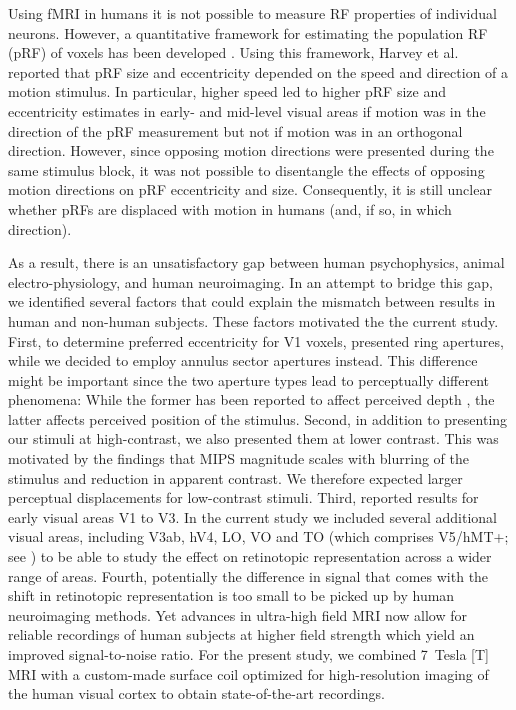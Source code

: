 Using fMRI in humans it is not possible to measure RF properties of individual neurons. However, a quantitative framework for estimating the population RF (pRF) of voxels has been developed \parencite{Dumoulin2008}. Using this framework, Harvey et al. \parencite*{Harvey2016} reported that pRF size and eccentricity depended on the speed and direction of a motion stimulus. In particular, higher speed led to higher pRF size and eccentricity estimates in early- and mid-level visual areas if motion was in the direction of the pRF measurement but not if motion was in an orthogonal direction. However, since opposing motion directions were presented during the same stimulus block, it was not possible to disentangle the effects of opposing motion directions on pRF eccentricity and size. Consequently, it is still unclear whether pRFs are displaced with motion in humans (and, if so, in which direction).

As a result, there is an unsatisfactory gap between human psychophysics, animal electro-physiology, and human neuroimaging. In an attempt to bridge this gap, we identified several factors that could explain the mismatch between results in human and non-human subjects. These factors motivated the the current study. First, to determine preferred eccentricity for V1 voxels, \cite{Liu2006} presented ring apertures, while we decided to employ annulus sector apertures instead. This difference might be important since the two aperture types lead to perceptually different phenomena: While the former has been reported to affect perceived depth \parencite{Edwards2003}, the latter affects perceived position of the stimulus. Second, in addition to presenting our stimuli at high-contrast, we also presented them at lower contrast. This was motivated by the findings that MIPS magnitude scales with blurring of the stimulus and reduction in apparent contrast. We therefore expected larger perceptual displacements for low-contrast stimuli. Third, \cite{Liu2006} reported results for early visual areas V1 to V3. In the current study we included several additional visual areas, including V3ab, hV4, LO, VO and TO (which comprises V5/hMT+; see \cite{Amano2009}) to be able to study the effect on retinotopic representation across a wider range of areas. Fourth, potentially the difference in signal that comes with the shift in retinotopic representation is too small to be picked up by human neuroimaging methods. Yet advances in ultra-high field MRI \parencite{Ugurbil2003} now allow for reliable recordings of human subjects at higher field strength which yield an improved signal-to-noise ratio. For the present study, we combined 7~Tesla [T] MRI with a custom-made surface coil optimized for high-resolution imaging of the human visual cortex \parencite{Sengupta2016} to obtain state-of-the-art recordings.

